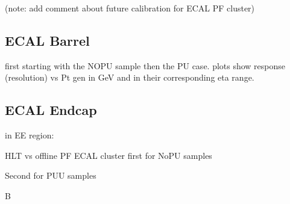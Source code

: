 
(note: add comment about future calibration for ECAL PF cluster)

\subsection{ECAL Barrel}
first starting with the NOPU sample then the PU case.
plots show response (resolution) vs Pt gen in GeV and in their corresponding eta range.





\subsection{ECAL Endcap}
in EE region:





HLT vs offline PF ECAL cluster
first for NoPU samples

Second for PUU samples

B
